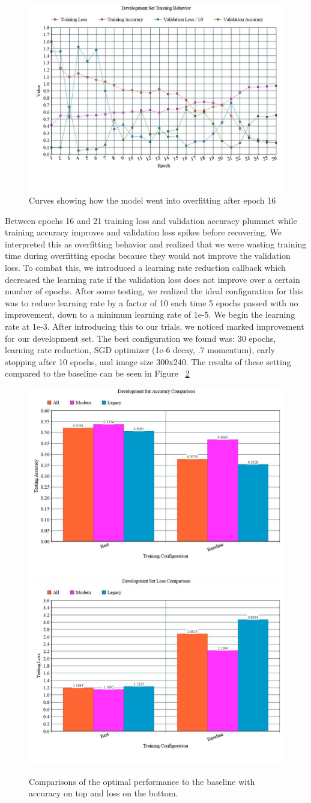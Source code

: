 \documentclass[letterpaper]{article} %
\begin{document}
\begin{figure}[h!]
  \includegraphics[width=.45\textwidth]{overfitting}
  \caption{Curves showing how the model went into overfitting after epoch 16}
  \label{fig:overfitting}
\end{figure}

Between epochs 16 and 21 training loss and validation accuracy plummet while
training accuracy improves and validation loss spikes before recovering.
We interpreted this as overfitting behavior and realized that we were wasting
training time during overfitting epochs because they would not improve the
validation loss.
To combat this, we introduced a learning rate reduction
callback which decreased the learning rate if the validation loss does not
improve over a certain number of epochs.
After some testing, we realized the
ideal configuration for this was to reduce learning rate by a factor of 10 each
time 5 epochs passed with no improvement, down to a minimum learning rate of 1e-5.
We begin the learning rate at 1e-3.
After introducing this to our trials,
we noticed marked improvement for our development set.
The best configuration we found was: 30 epochs, learning rate
reduction, SGD optimizer (1e-6 decay, .7 momentum), early stopping after 10
epochs, and image size 300x240.
The results of these setting compared
to the baseline can be seen in Figure ~\ref{fig:best}

\begin{figure}
  \includegraphics[width=.45\textwidth]{best-accuracy}
  \includegraphics[width=.45\textwidth]{best-loss}
  \caption{Comparisons of the optimal performance to the baseline with accuracy on top and loss on the bottom.}
  \label{fig:best}
\end{figure}
\end{document}
